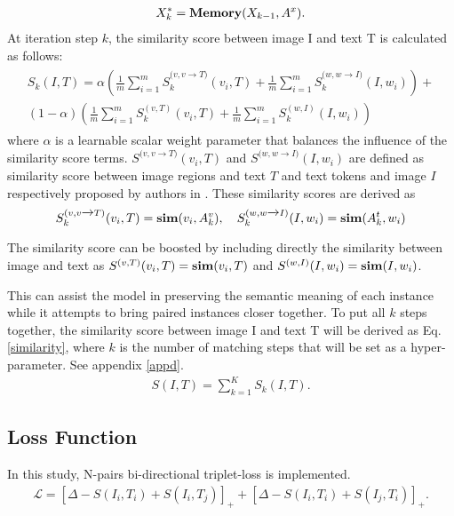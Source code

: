 \documentclass{midl}
\begin{document}
\begin{align}\label{iterative_eq}
X_k^* = \textrm{\textbf{Memory}}(X_{k-1}, A^x).
\end{align}
At iteration step $k$, the similarity score between image I and text T is calculated as follows:
\begin{align}\label{similarity_k}
\begin{split}
S_k(I,T) = \alpha\left(\frac{1}{m}\sum_{i=1}^{m} S_k^{{(v,v\xrightarrow[]{}T})}(v_i,T)+\frac{1}{m}\sum_{i=1}^{m} S_k^{{(w,w\xrightarrow[]{}I})}(I,w_i)\right)+ \\
(1-\alpha)\left( \frac{1}{m}\sum_{i=1}^{m} S_k^{(v,T)}(v_i,T) + \frac{1}{m}\sum_{i=1}^{m} S_k^{(w,I)}(I,w_i)\right)
\end{split}
\end{align}
where $\alpha$ is a learnable scalar weight parameter that balances the influence of the similarity score terms. $S^{{(v,v\xrightarrow[]{}T})}(v_i,T)$ and $S^{{(w,w\xrightarrow[]{}I})}(I,w_i)$ are defined as similarity score between image regions and text $T$ and text tokens and image $I$ respectively proposed by authors in \cite{chen2020imram} . These similarity scores are derived as 
\begin{equation}\label{cosine_similarity}
S_k^{{(v,v\xrightarrow[]{}T})}(v_i,T) = \textrm{\textbf{sim}}(v_i, A_k^v), \quad S_k^{{(w,w\xrightarrow[]{}I})}(I,w_i) = \textrm{\textbf{sim}}(A_k^t, w_i)
\end{equation}


The similarity score can be boosted by including directly the similarity between image and text as $S^{(v,T)}(v_i,T)= \textrm{\textbf{sim}}(v_i, T)$ and $S^{(w,I)}(I,w_i)=\textrm{\textbf{sim}}(I, w_i)$.

This can assist the model in preserving the semantic meaning of each instance while it attempts to bring paired instances closer together.
To put all $k$ steps together, the similarity score between image I and text T will be derived as Eq.\ref{similarity}, where $k$ is the number of matching steps that will be set as a hyper-parameter. See appendix \ref{appd}.
\begin{align}\label{similarity}
S(I,T) = \sum_{k=1}^{K} S_k(I,T).
\end{align}


 
\subsection{Loss Function}
\label{loss}
In this study, N-pairs bi-directional triplet-loss is implemented.
\begin{align}\label{seprated_loss}
\mathcal{L} = [\Delta - S(I_i, T_i)+S(I_i, T_j)]_+ + [\Delta - S(I_i, T_i)+S(I_j, T_i)]_+.
\end{align}
\end{document}
